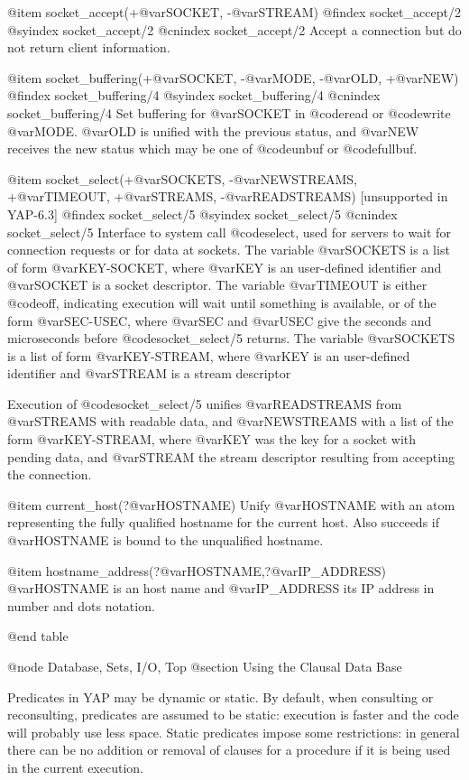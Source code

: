 {{{{{@item socket_accept(+@var{SOCKET}, -@var{STREAM})
@findex socket_accept/2
@syindex socket_accept/2
@cnindex socket_accept/2
Accept a connection but do not return client information.

@item socket_buffering(+@var{SOCKET}, -@var{MODE}, -@var{OLD}, +@var{NEW})
@findex socket_buffering/4
@syindex socket_buffering/4
@cnindex socket_buffering/4
Set buffering for @var{SOCKET} in @code{read} or @code{write}
@var{MODE}. @var{OLD} is unified with the previous status, and @var{NEW}
receives the new status which may be one of @code{unbuf} or
@code{fullbuf}.

@item socket_select(+@var{SOCKETS}, -@var{NEWSTREAMS}, +@var{TIMEOUT},
+@var{STREAMS}, -@var{READSTREAMS}) [unsupported in YAP-6.3]
@findex socket_select/5
@syindex socket_select/5
@cnindex socket_select/5
Interface to system call @code{select}, used for servers to wait for
connection requests or for data at sockets. The variable
@var{SOCKETS} is a list of form @var{KEY-SOCKET}, where @var{KEY} is
an user-defined identifier and @var{SOCKET} is a socket descriptor. The
variable @var{TIMEOUT} is either @code{off}, indicating execution will
wait until something is available, or of the form @var{SEC-USEC}, where
@var{SEC} and @var{USEC} give the seconds and microseconds before
@code{socket_select/5} returns. The variable @var{SOCKETS} is a list of
form @var{KEY-STREAM}, where @var{KEY} is an user-defined identifier
and @var{STREAM} is a stream descriptor

Execution of @code{socket_select/5} unifies @var{READSTREAMS} from
@var{STREAMS} with readable data, and @var{NEWSTREAMS} with a list of
the form @var{KEY-STREAM}, where @var{KEY} was the key for a socket
with pending data, and @var{STREAM} the stream descriptor resulting
from accepting the connection.  

@item current_host(?@var{HOSTNAME})
Unify @var{HOSTNAME} with an atom representing the fully qualified
hostname for the current host. Also succeeds if @var{HOSTNAME} is bound
to the unqualified hostname.

@item hostname_address(?@var{HOSTNAME},?@var{IP_ADDRESS})
@var{HOSTNAME} is an host name and @var{IP_ADDRESS} its IP
address in number and dots notation.


@end table

@node Database, Sets, I/O, Top
@section Using the Clausal Data Base

Predicates in YAP may be dynamic or static. By default, when
consulting or reconsulting, predicates are assumed to be static:
execution is faster and the code will probably use less space.
Static predicates impose some restrictions: in general there can be no 
addition or removal of  clauses for a procedure if it is being used in the
current execution.

}}}}}
